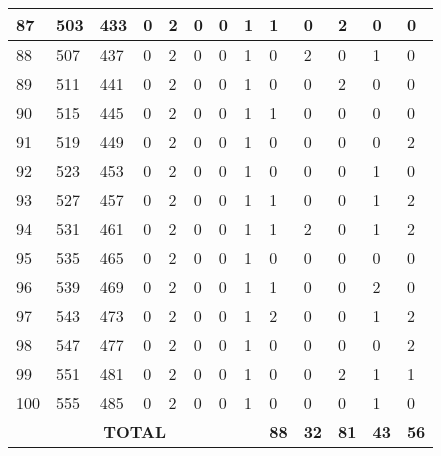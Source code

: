 \begin{sidewaystable}[!h]
\begin{tabular}{|l|l|l|l|l|l|l|l|l|l|l|l|l|}
		87 & 503 & 433 & 0 & 2 & 0 & 0 & 1 & 1 & 0 & 2 & 0 & 0 \\ \hline
		88 & 507 & 437 & 0 & 2 & 0 & 0 & 1 & 0 & 2 & 0 & 1 & 0 \\ \hline
		89 & 511 & 441 & 0 & 2 & 0 & 0 & 1 & 0 & 0 & 2 & 0 & 0 \\ \hline
		90 & 515 & 445 & 0 & 2 & 0 & 0 & 1 & 1 & 0 & 0 & 0 & 0 \\ \hline
		91 & 519 & 449 & 0 & 2 & 0 & 0 & 1 & 0 & 0 & 0 & 0 & 2 \\ \hline
		92 & 523 & 453 & 0 & 2 & 0 & 0 & 1 & 0 & 0 & 0 & 1 & 0 \\ \hline
		93 & 527 & 457 & 0 & 2 & 0 & 0 & 1 & 1 & 0 & 0 & 1 & 2 \\ \hline
		94 & 531 & 461 & 0 & 2 & 0 & 0 & 1 & 1 & 2 & 0 & 1 & 2 \\ \hline
		95 & 535 & 465 & 0 & 2 & 0 & 0 & 1 & 0 & 0 & 0 & 0 & 0 \\ \hline
		96 & 539 & 469 & 0 & 2 & 0 & 0 & 1 & 1 & 0 & 0 & 2 & 0 \\ \hline
		97 & 543 & 473 & 0 & 2 & 0 & 0 & 1 & 2 & 0 & 0 & 1 & 2 \\ \hline
		98 & 547 & 477 & 0 & 2 & 0 & 0 & 1 & 0 & 0 & 0 & 0 & 2 \\ \hline
		99 & 551 & 481 & 0 & 2 & 0 & 0 & 1 & 0 & 0 & 2 & 1 & 1 \\ \hline
		100 & 555 & 485 & 0 & 2 & 0 & 0 & 1 & 0 & 0 & 0 & 1 & 0 \\ \hline
		\multicolumn{8}{|c|}{\textbf{TOTAL}} & \textbf{88} & \textbf{32} & \textbf{81} & \textbf{43} & \textbf{56} \\ \hline
	\end{tabular}
\end{sidewaystable}
\clearpage

